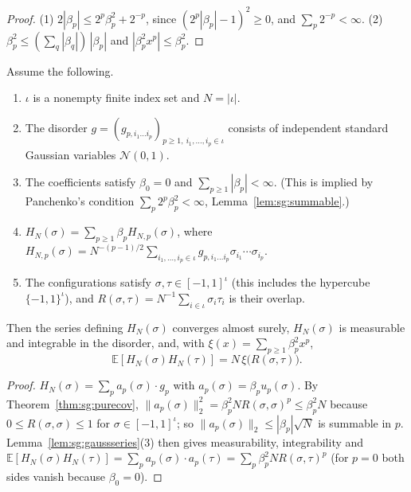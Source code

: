 \begin{proof}
  \leanok
(1) $2|\beta_p|\le2^p\beta_p^2+2^{-p}$, since $(2^p|\beta_p|-1)^2\ge0$, and $\sum_p2^{-p}<\infty$. (2) $\beta_p^2\le
(\sum_q|\beta_q|)\,|\beta_p|$ and $|\beta_p^2x^p|\le\beta_p^2$.
\end{proof}

\begin{theorem}\label{thm:sg:mixedcov}
  \leanok
Assume the following.
\begin{enumerate}
\item[(H1)] $\iota$ is a nonempty finite index set and $N=|\iota|$.
\item[(H2)] The disorder $g=(g_{p,i_1\dots i_p})_{p\ge1,\ i_1,\dots,i_p\in\iota}$ consists of independent standard
  Gaussian variables $\mathcal N(0,1)$.
\item[(H3)] The coefficients satisfy $\beta_0=0$ and $\sum_{p\ge1}|\beta_p|<\infty$. (This is implied by Panchenko's
  condition $\sum_p2^p\beta_p^2<\infty$, Lemma~\ref{lem:sg:summable}.)
\item[(H4)] $H_N(\sigma)=\sum_{p\ge1}\beta_pH_{N,p}(\sigma)$, where
  $H_{N,p}(\sigma)=N^{-(p-1)/2}\sum_{i_1,\dots,i_p\in\iota}g_{p,i_1\dots i_p}\sigma_{i_1}\cdots\sigma_{i_p}$.
\item[(H5)] The configurations satisfy $\sigma,\tau\in[-1,1]^\iota$ (this includes the hypercube
  $\{-1,1\}^\iota$), and $R(\sigma,\tau)=N^{-1}\sum_{i\in\iota}\sigma_i\tau_i$ is their overlap.
\end{enumerate}
Then the series defining $H_N(\sigma)$ converges almost surely, $H_N(\sigma)$ is measurable and integrable in the
disorder, and, with $\xi(x)=\sum_{p\ge1}\beta_p^2x^p$,
\[\mathbb E[H_N(\sigma)H_N(\tau)]=N\,\xi\big(R(\sigma,\tau)\big).\]
\end{theorem}

\begin{proof}
  \leanok
$H_N(\sigma)=\sum_pa_p(\sigma)\cdot g_p$ with $a_p(\sigma)=\beta_pu_p(\sigma)$. By Theorem~\ref{thm:sg:purecov},
$\|a_p(\sigma)\|_2^2=\beta_p^2NR(\sigma,\sigma)^p\le\beta_p^2N$ because $0\le R(\sigma,\sigma)\le1$ for
$\sigma\in[-1,1]^\iota$; so $\|a_p(\sigma)\|_2\le|\beta_p|\sqrt N$ is summable in $p$. Lemma~\ref{lem:sg:gaussseries}(3) then gives
measurability, integrability and $\mathbb E[H_N(\sigma)H_N(\tau)]=\sum_pa_p(\sigma)\cdot a_p(\tau)
=\sum_p\beta_p^2NR(\sigma,\tau)^p$ (for $p=0$ both sides vanish because $\beta_0=0$).
\end{proof}

